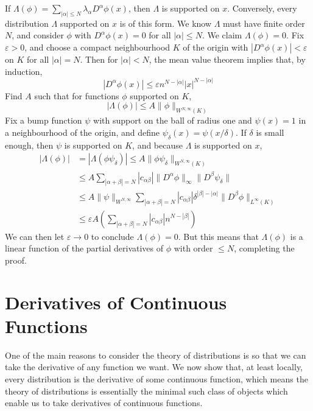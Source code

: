 \begin{example}
    If $\Lambda(\phi) = \sum_{|\alpha| \leq N} \lambda_\alpha D^\alpha \phi(x)$, then $\Lambda$ is supported on $x$. Conversely, every distribution $\Lambda$ supported on $x$ is of this form. We know $\Lambda$ must have finite order $N$, and consider $\phi$ with $D^\alpha \phi(x) = 0$ for all $|\alpha| \leq N$. We claim $\Lambda(\phi) = 0$. Fix $\varepsilon > 0$, and choose a compact neighbourhood $K$ of the origin with $|D^\alpha \phi(x)| < \varepsilon$ on $K$ for all $|\alpha| = N$. Then for $|\alpha| < N$, the mean value theorem implies that, by induction,
    \[ |D^\alpha \phi(x)| \leq \varepsilon n^{N - |\alpha|} |x|^{N-|\alpha|} \]
    Find $A$ such that for functions $\phi$ supported on $K$,
    \[ |\Lambda(\phi)| \leq A \| \phi \|_{W^{N,\infty}(K)} \]
    Fix a bump function $\psi$ with support on the ball of radius one and $\psi(x) = 1$ in a neighbourhood of the origin, and define $\psi_\delta(x) = \psi(x/\delta)$. If $\delta$ is small enough, then $\psi$ is supported on $K$, and because $\Lambda$ is supported on $x$,
    \begin{align*}
        |\Lambda(\phi)| &= |\Lambda(\phi \psi_\delta)| \leq A \| \phi \psi_\delta \|_{W^{N,\infty}(K)}\\
        &\leq A \sum_{|\alpha + \beta| = N} |c_{\alpha \beta}| \| D^\alpha \phi \|_\infty \| D^\beta \psi_\delta \|\\
        &\leq A \| \psi \|_{W^{N,\infty}} \sum_{|\alpha + \beta| = N} |c_{\alpha \beta}| \delta^{|\beta| - |\alpha|} \| D^\beta \phi \|_{L^\infty(K)}\\
        &\leq \varepsilon A \left( \sum_{|\alpha + \beta| = N} |c_{\alpha \beta}| n^{N - |\beta|} \right)
    \end{align*}
    We can then let $\varepsilon \to 0$ to conclude $\Lambda(\phi) = 0$. But this means that $\Lambda(\phi)$ is a linear function of the partial derivatives of $\phi$ with order $\leq N$, completing the proof.
\end{example}

\section{Derivatives of Continuous Functions}

One of the main reasons to consider the theory of distributions is so that we can take the derivative of any function we want. We now show that, at least locally, every distribution is the derivative of some continuous function, which means the theory of distributions is essentially the minimal such class of objects which enable us to take derivatives of continuous functions.


